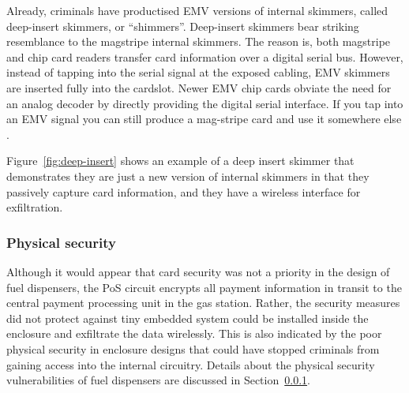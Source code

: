 Already, criminals have productised EMV versions of internal skimmers, called
deep-insert skimmers, or ``shimmers''.
%
Deep-insert skimmers bear striking resemblance to the magstripe internal
skimmers.
%
The reason is, both magstripe and chip card readers transfer card information
over a digital serial bus.
%
However, instead of tapping into the serial signal at the exposed cabling, EMV
skimmers are inserted fully into the cardslot.
%
Newer EMV chip cards obviate the need for an analog decoder by directly
providing the digital serial interface.
%
If you tap into an EMV signal you can still produce a mag-stripe card and use
it somewhere else .


Figure~\ref{fig:deep-insert} shows an example of a deep insert skimmer that
demonstrates they are just a new version of internal skimmers in that they
passively capture card information, and they have a wireless interface for
exfiltration.



\subsubsection{Physical security}
\label{sec:phys-security}

Although it would appear that card security was not a priority in the design of
fuel dispensers, the PoS circuit encrypts all payment information in transit to
the central payment processing unit in the gas station.
%
Rather, the security measures did not protect against tiny embedded system
could be installed inside the enclosure and exfiltrate the data wirelessly.
%
This is also indicated by the poor physical security in enclosure designs that
could have stopped criminals from gaining access into the internal circuitry.
%
Details about the physical security vulnerabilities of fuel dispensers are
discussed in Section~\ref{sec:phys-security}. 

